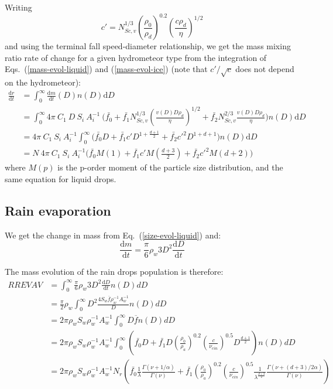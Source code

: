 Writing
\begin{equation}
 c' = N_{Sc,v}^{1/3} \left(\frac{\rho_0}{\rho_d}\right)^{0.2} \left(\frac{c \rho_d}{\eta}\right)^{1/2} 
\end{equation}
and using the terminal fall speed-diameter relationship, we get the mass mixing ratio rate of change for a given hydrometeor type from the integration of Eqs.\ (\ref{mass-evol-liquid}) and (\ref{mass-evol-ice}) (note that $c'/\sqrt{c}$ does not depend on the hydrometeor):
\begin{align}
 \frac{\mathrm{d}r}{\mathrm{d}t} &= \int_0^\infty \frac{\mathrm{d}m}{\mathrm{d}t}(D) n(D) \mathrm{d}D \\
 &= \int_0^\infty 4\pi ~ C_1 ~ D ~ S_i ~ A_i^{-1} ~ \Bigg(\bar{f_0} + \bar{f_1} N_{Sc,v}^{1/3} \left(\frac{v(D)D\rho_d}{\eta}\right)^{1/2} + \bar{f_2} N_{Sc,v}^{2/3} \frac{v(D)D\rho_d}{\eta} \Bigg) n(D) \mathrm{d}D \\
 &= 4\pi ~ C_1 ~ S_i ~ A_i^{-1} \int_0^\infty \Bigg(\bar{f_0} D + \bar{f_1} c' D^{1+\frac{d+1}{2}} + \bar{f_2} c'^2 D^{1+d+1} \Bigg) n(D) \mathrm{d}D \\
 \label{mixing-ratio-evol}
 &= N ~ 4\pi ~ C_1 ~ S_i ~ A_i^{-1} \Bigg( \bar{f_0} M(1) + \bar{f_1} c' M(\frac{d+3}{2}) + \bar{f_2} c'^2 M(d+2) \Bigg)
\end{align}
where $M(p)$ is the p-order moment of the particle size distribution, and the same equation for liquid drops.

\subsection{Rain evaporation}

We get the change in mass from Eq.\ (\ref{size-evol-liquid}) and:
\begin{equation}
 \frac{\mathrm{d}m}{\mathrm{d}t} = \frac{\pi}{6} \rho_w 3 D^2 \frac{\mathrm{d}D}{\mathrm{d}t}
\end{equation}

The mass evolution of the rain drops population is therefore:
\begin{align}
 RREVAV &= \int_0^\infty \frac{\pi}{6} \rho_w 3 D^2 \frac{\mathrm{d}D}{\mathrm{d}t} n(D) dD \\
 &= \frac{\pi}{2} \rho_w \int_0^\infty D^2 \frac{4 S_w \overline{f} \rho_w^{-1} A_w^{-1}}{D} n(D) dD \\ 
 &= 2 \pi \rho_w S_w \rho_w^{-1} A_w^{-1} \int_0^\infty D \overline{f} n(D) dD \\ 
 &= 2 \pi \rho_w S_w \rho_w^{-1} A_w^{-1} \int_0^\infty \left( \bar{f_0} D + \bar{f_1} D \left(\frac{\rho_0}{\rho_a}\right)^{0.2} \left(\frac{c}{\nu_{cin}}\right)^{0.5} D^{\frac{d+1}{2}}\right) n(D) dD \\ 
 &= 2 \pi \rho_w S_w \rho_w^{-1} A_w^{-1} N_r \left( \bar{f_0} \frac{1}{\lambda} \frac{\Gamma(\nu + 1 / \alpha)}{\Gamma(\nu)}+ \bar{f_1} \left(\frac{\rho_0}{\rho_a}\right)^{0.2} \left(\frac{c}{\nu_{cin}}\right)^{0.5} \frac{1}{\lambda^\frac{d+3}{2}} \frac{\Gamma(\nu + (d+3)/2\alpha)}{\Gamma(\nu)} \right)\\ 
\end{align}

